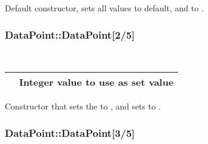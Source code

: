 \documentclass[letterpaper,10pt,english]{sphinxmanual}
\begin{document}
\begin{fulllineitems}
\label{\detokenize{datapoint:_CPPv2N6pessum9DataPoint9DataPointEv}}%
\pysigstartmultiline
{}%
\pysigstopmultiline
Default constructor, sets all values to default, and  to
.

\end{fulllineitems}



\subsubsection{DataPoint::DataPoint{[}2/5{]}}
\label{\detokenize{datapoint:datapoint-datapoint-2-5}}

\begin{fulllineitems}
\label{\detokenize{datapoint:_CPPv2N6pessum9DataPoint9DataPointEi}}%
\pysigstartmultiline
{}%
\pysigstopmultiline~

\begin{savenotes}\sphinxattablestart
\centering
\begin{tabulary}{\linewidth}[t]{|T|T|}
\hline

&
Integer value to use as set value
\\
\hline
\end{tabulary}
\par
\sphinxattableend\end{savenotes}

Constructor that sets the  to , and sets
 to .

\end{fulllineitems}



\subsubsection{DataPoint::DataPoint{[}3/5{]}}
\label{\detokenize{datapoint:datapoint-datapoint-3-5}}
\end{document}
